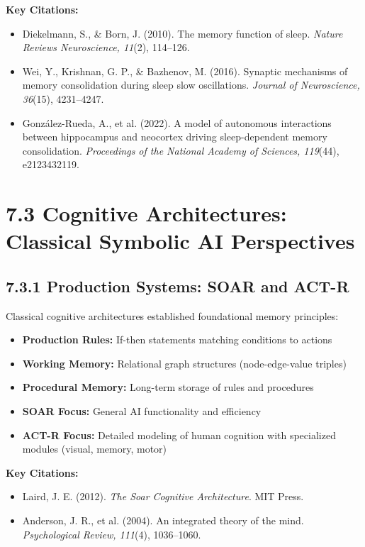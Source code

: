\documentclass[11pt,letterpaper]{article}
\begin{document}
\textbf{Key Citations:}
\begin{itemize}[leftmargin=*]
    \item Diekelmann, S., \& Born, J. (2010). The memory function of sleep. \textit{Nature Reviews Neuroscience, 11}(2), 114--126.
    \item Wei, Y., Krishnan, G. P., \& Bazhenov, M. (2016). Synaptic mechanisms of memory consolidation during sleep slow oscillations. \textit{Journal of Neuroscience, 36}(15), 4231--4247.
    \item González-Rueda, A., et al. (2022). A model of autonomous interactions between hippocampus and neocortex driving sleep-dependent memory consolidation. \textit{Proceedings of the National Academy of Sciences, 119}(44), e2123432119.
\end{itemize}

\section{\color{garnet}7.3 Cognitive Architectures: Classical Symbolic AI Perspectives}

\subsection{7.3.1 Production Systems: SOAR and ACT-R}

Classical cognitive architectures established foundational memory principles:

\begin{itemize}[leftmargin=*]
    \item \textbf{Production Rules:} If-then statements matching conditions to actions
    \item \textbf{Working Memory:} Relational graph structures (node-edge-value triples)
    \item \textbf{Procedural Memory:} Long-term storage of rules and procedures
    \item \textbf{SOAR Focus:} General AI functionality and efficiency
    \item \textbf{ACT-R Focus:} Detailed modeling of human cognition with specialized modules (visual, memory, motor)
\end{itemize}

\textbf{Key Citations:}
\begin{itemize}[leftmargin=*]
    \item Laird, J. E. (2012). \textit{The Soar Cognitive Architecture}. MIT Press.
    \item Anderson, J. R., et al. (2004). An integrated theory of the mind. \textit{Psychological Review, 111}(4), 1036--1060.
\end{itemize}
\end{document}
